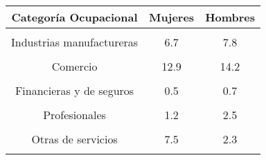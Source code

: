 \begin{tabular}[t]{ccc}
\toprule
\textbf{Categoría Ocupacional} & \textbf{Mujeres} & \textbf{Hombres}\\
\midrule
\cellcolor[HTML]{B6B3FF}{Agricultura} & \cellcolor[HTML]{B6B3FF}{3.7} & \cellcolor[HTML]{B6B3FF}{23.4}\\
Industrias manufactureras & 6.7 & 7.8\\
\cellcolor[HTML]{B6B3FF}{Construcción} & \cellcolor[HTML]{B6B3FF}{0.0} & \cellcolor[HTML]{B6B3FF}{7.4}\\
Comercio & 12.9 & 14.2\\
\cellcolor[HTML]{B6B3FF}{Comunicaciones} & \cellcolor[HTML]{B6B3FF}{0.1} & \cellcolor[HTML]{B6B3FF}{0.5}\\
Financieras y de seguros & 0.5 & 0.7\\
\cellcolor[HTML]{B6B3FF}{Inmobiliarias} & \cellcolor[HTML]{B6B3FF}{0.2} & \cellcolor[HTML]{B6B3FF}{0.2}\\
Profesionales & 1.2 & 2.5\\
\cellcolor[HTML]{B6B3FF}{Administración pública} & \cellcolor[HTML]{B6B3FF}{4.1} & \cellcolor[HTML]{B6B3FF}{3.8}\\
Otras de servicios & 7.5 & 2.3\\
\cellcolor[HTML]{B6B3FF}{NS/NR} & \cellcolor[HTML]{B6B3FF}{0.1} & \cellcolor[HTML]{B6B3FF}{0.1}\\
\bottomrule
\end{tabular}
